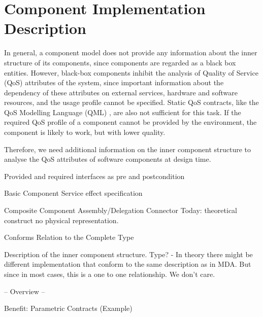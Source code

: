 \section{Component Implementation Description}
\label{sec:ComponentImplementation}

In general, a component model does not provide any information about the inner structure of its components, since components are regarded as a black box entities. However, black-box components inhibit the analysis of Quality of Service (QoS) attributes of the system, since important information about the dependency of these attributes on external services, hardware and software resources, and the usage profile cannot be specified. Static QoS contracts, like the QoS Modelling Language (QML) \cite{frolund1998a}, are also not sufficient for this task. If the required QoS profile of a component cannot be provided by the environment, the component is likely to work, but with lower quality. 

Therefore, we need additional information on the inner component structure to analyse the QoS attributes of software components at design time.

Provided and required interfaces as pre and postcondition

Basic Component
Service effect specification

Composite Component
Assembly/Delegation Connector 
Today: theoretical construct no physical representation.

Conforms Relation to the Complete Type

Description of the inner component structure. Type? -  In theory there might be different implementation that conform to the same description as in MDA. But since in most cases, this is a one to one relationship. We don't care.

-- Overview --

Benefit: Parametric Contracts (Example)

